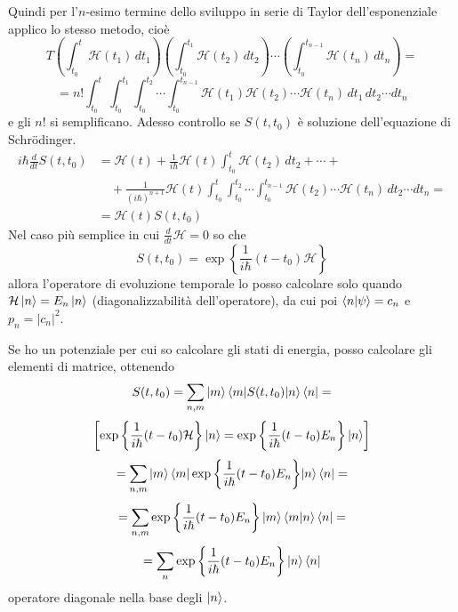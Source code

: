 Quindi per l'\(n\)-esimo termine dello sviluppo in serie di Taylor dell'esponenziale applico lo stesso metodo, cioè
\[
T \left( \int_{t_0}^t \mathcal{H}(t_1) \, dt_1 \right) \left( \int_{t_0}^{t_1} \mathcal{H}(t_2) \, dt_2 \right) \cdots \left( \int_{t_0}^{t_{n - 1}} \mathcal{H}(t_n) \, dt_n \right) =
\]
\[
= n! \int_{t_0}^t \int_{t_0}^{t_1} \int_{t_0}^{t_2} \cdots \int_{t_0}^{t_{n - 1}} \mathcal{H}(t_1) \mathcal{H}(t_2) \cdots \mathcal{H}(t_n) \, dt_1 \, dt_2 \cdots dt_n
\]
e gli \( n! \) si semplificano. Adesso controllo se \( S(t, t_0) \) è soluzione dell'equazione di Schr\"odinger.
\begin{align*}
i \hbar \frac{d}{dt} S(t, t_0) &= \mathcal{H}(t) + \frac{1}{i \hbar} \mathcal{H}(t) \int_{t_0}^t \mathcal{H}(t_2) \, dt_2 + \cdots + \\
&\quad + \frac{1}{(i \hbar)^{n + 1}} \mathcal{H}(t) \int_{t_0}^t \int_{t_0}^{t_2} \cdots \int_{t_0}^{t_{n - 1}} \mathcal{H}(t_2) \cdots \mathcal{H}(t_n) \, dt_2 \cdots dt_n = \\
&= \mathcal{H}(t) S(t, t_0)
\end{align*}
Nel caso più semplice in cui \( \frac{d}{dt} \mathcal{H} = 0 \) so che
\[
S(t, t_0) = \exp\left\{ \frac{1}{i \hbar} (t - t_0) \mathcal{H} \right\}
\]
allora l'operatore di evoluzione temporale lo posso calcolare solo quando \( \mathcal{H} \ket{n} = E_n \ket{n} \) (diagonalizzabilità dell'operatore), da cui poi \( \braket{n|\psi} = c_n \) e \( p_n = |c_n|^2\).

\bigskip
\noindent
Se ho un potenziale per cui so calcolare gli stati di energia, posso calcolare gli elementi di matrice, ottenendo
\[
S(t, t_0) = \sum_{n,m} \ket{m} \braket{m|S(t, t_0)|n} \bra{n} =
\]
\[
\left[ \exp{\left\{ \frac{1}{i \hbar} (t - t_0)  \mathcal{H} \right\} } \ket{n} = \exp{\left\{ \frac{1}{i \hbar} (t - t_0) E_n \right\}} \ket{n} \right]
\]
\[
= \sum_{n,m} \ket{m} \braket{m|\exp{\left\{ \frac{1}{i \hbar} (t - t_0) E_n \right\}}|n} \bra{n} =
\]
\[
= \sum_{n,m} \exp{\left\{ \frac{1}{i \hbar} (t - t_0) E_n \right\}} \ket{m} \braket{m|n} \bra{n} = 
\]
\[
= \sum_n \exp{\left\{ \frac{1}{i \hbar} (t - t_0) E_n \right\}} \ket{n} \bra{n}
\]
operatore diagonale nella base degli \( \ket{n} \).

